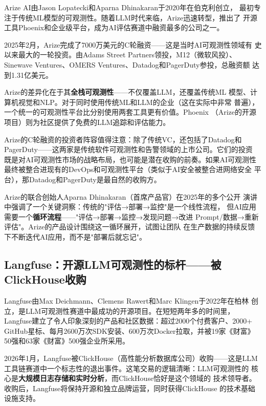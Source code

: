 Arize AI由Jason Lopatecki和Aparna Dhinakaran于2020年在伯克利创立，
最初专注于传统ML模型的可观测性。随着LLM时代来临，Arize迅速转型，推出了
开源工具Phoenix和企业级平台，成为AI评估赛道中融资最多的公司之一。

2025年2月，Arize完成了7000万美元的C轮融资——这是当时AI可观测性领域有
史以来最大的一轮投资。由Adams Street Partners领投，M12（微软风投）、
Sinewave Ventures、OMERS Ventures、Datadog和PagerDuty参投，总融资额
达到1.31亿美元。

Arize的差异化在于其\textbf{全栈可观测性}——不仅覆盖LLM，还覆盖传统ML
模型、计算机视觉和NLP。对于同时使用传统ML和LLM的企业（这在实际中非常
普遍），一个统一的可观测性平台比分别使用两套工具更有价值。Phoenix
（Arize的开源项目）则为社区提供了免费的LLM追踪和评估能力。

Arize的C轮融资的投资者阵容值得注意：除了传统VC，还包括了Datadog和
PagerDuty——这两家是传统软件可观测性和告警领域的上市公司。它们的投资
既是对AI可观测性市场的战略布局，也可能是潜在收购的前奏。如果AI可观测性
最终被整合进现有的DevOps和可观测性平台（类似于AI安全被整合进网络安全
平台），那Datadog和PagerDuty是最自然的收购方。

Arize的联合创始人Aparna Dhinakaran（首席产品官）在2025年的多个公开
演讲中强调了一个关键洞察：传统的"评估→部署→监控"是一个线性流程，
但AI应用需要一个\textbf{循环流程}——"评估→部署→监控→发现问题→改进
Prompt/数据→重新评估"。Arize的产品设计围绕这一循环展开，试图让团队
在生产数据的持续反馈下不断迭代AI应用，而不是"部署后就忘记"。

\subsection{Langfuse：开源LLM可观测性的标杆——被ClickHouse收购}
\label{subsec:langfuse}

Langfuse由Max Deichmann、Clemens Rawert和Marc Klingen于2022年在柏林
创立，是LLM可观测性赛道中最成功的开源项目。在短短两年多的时间里，
Langfuse建立了令人印象深刻的产品和社区数据：超过2000个付费客户、2000+
GitHub星标、每月2600万次SDK安装、600万次Docker拉取，并被19家《财富》
50强和63家《财富》500强企业所采用。

2026年1月，Langfuse被ClickHouse（高性能分析数据库公司）收购——这是LLM
工具链赛道中一个标志性的退出事件。这笔交易的逻辑清晰：LLM可观测性的
核心是\textbf{大规模日志存储和实时分析}，而ClickHouse恰好是这个领域的
技术领导者。收购后，Langfuse将保持开源和独立品牌运营，同时获得ClickHouse
的技术基础设施支持。

